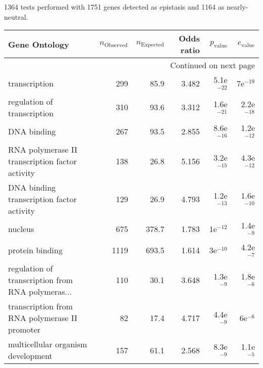 1364 tests performed with 1751 genes detected as epistasis and 1164 as nearly-neutral.
\scriptsize
\begin{longtable}{lrrrrr}
\toprule
                                     Gene Ontology & $n_{\mathrm{Observed}}$ & $n_{\mathrm{Expected}}$ & Odds ratio & $p_{\mathrm{value}}$ & $e_{\mathrm{value}}$ \\
\midrule
\endhead
\midrule
\multicolumn{6}{r}{{Continued on next page}} \\
\midrule
\endfoot

\bottomrule
\endlastfoot
                                     transcription &                     299 &                    85.9 &      3.482 &         5.1e$^{-22}$ &           7e$^{-19}$ \\
                       regulation of transcription &                     310 &                    93.6 &      3.312 &         1.6e$^{-21}$ &         2.2e$^{-18}$ \\
                                       DNA binding &                     267 &                    93.5 &      2.855 &         8.6e$^{-16}$ &         1.2e$^{-12}$ \\
   RNA polymerase II transcription factor activity &                     138 &                    26.8 &      5.156 &         3.2e$^{-15}$ &         4.3e$^{-12}$ \\
         DNA binding transcription factor activity &                     129 &                    26.9 &      4.793 &         1.2e$^{-13}$ &         1.6e$^{-10}$ \\
                                           nucleus &                     675 &                   378.7 &      1.783 &           1e$^{-12}$ &          1.4e$^{-9}$ \\
                                   protein binding &                    1119 &                   693.5 &      1.614 &           3e$^{-10}$ &          4.2e$^{-7}$ \\
 regulation of transcription from RNA polymeras... &                     110 &                    30.1 &      3.648 &          1.3e$^{-9}$ &          1.8e$^{-6}$ \\
     transcription from RNA polymerase II promoter &                      82 &                    17.4 &      4.717 &          4.4e$^{-9}$ &            6e$^{-6}$ \\
                multicellular organism development &                     157 &                    61.1 &      2.568 &          8.3e$^{-9}$ &          1.1e$^{-5}$ \\

\end{longtable}
